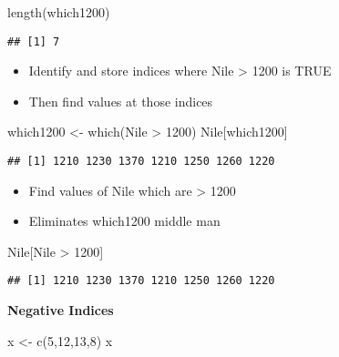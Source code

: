\documentclass[
]{article}
\newenvironment{Shaded}{\begin{snugshade}}{\end{snugshade}}
\newcommand{\DecValTok}[1]{\textcolor[rgb]{0.00,0.00,0.81}{#1}}
\newcommand{\FunctionTok}[1]{\textcolor[rgb]{0.00,0.00,0.00}{#1}}
\newcommand{\NormalTok}[1]{#1}
\newcommand{\OtherTok}[1]{\textcolor[rgb]{0.56,0.35,0.01}{#1}}
\newcommand{\SpecialCharTok}[1]{\textcolor[rgb]{0.00,0.00,0.00}{#1}}
\begin{document}
\begin{Shaded}
\begin{Highlighting}[]
\FunctionTok{length}\NormalTok{(which1200)}
\end{Highlighting}
\end{Shaded}

\begin{verbatim}
## [1] 7
\end{verbatim}

\begin{itemize}
\item
  Identify and store indices where Nile \textgreater{} 1200 is TRUE
\item
  Then find values at those indices
\end{itemize}

\begin{Shaded}
\begin{Highlighting}[]
\NormalTok{which1200 }\OtherTok{\textless{}{-}} \FunctionTok{which}\NormalTok{(Nile }\SpecialCharTok{\textgreater{}} \DecValTok{1200}\NormalTok{)}
\NormalTok{Nile[which1200]}
\end{Highlighting}
\end{Shaded}

\begin{verbatim}
## [1] 1210 1230 1370 1210 1250 1260 1220
\end{verbatim}

\begin{itemize}
\item
  Find values of Nile which are \textgreater{} 1200
\item
  Eliminates which1200 middle man
\end{itemize}

\begin{Shaded}
\begin{Highlighting}[]
\NormalTok{Nile[Nile }\SpecialCharTok{\textgreater{}} \DecValTok{1200}\NormalTok{]}
\end{Highlighting}
\end{Shaded}

\begin{verbatim}
## [1] 1210 1230 1370 1210 1250 1260 1220
\end{verbatim}

\textbf{Negative Indices}

\begin{Shaded}
\begin{Highlighting}[]
\NormalTok{x }\OtherTok{\textless{}{-}} \FunctionTok{c}\NormalTok{(}\DecValTok{5}\NormalTok{,}\DecValTok{12}\NormalTok{,}\DecValTok{13}\NormalTok{,}\DecValTok{8}\NormalTok{)}
\NormalTok{x}
\end{Highlighting}
\end{Shaded}
\end{document}

